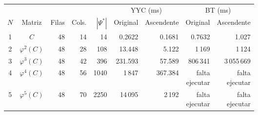 {\scriptsize
\setlength{\tabcolsep}{3pt}
\begin{tabular}{c c r r r r r r r}
\toprule
\multicolumn{5}{c}{} & \multicolumn{2}{c}{YYC (ms)} & \multicolumn{2}{c}{BT (ms)} \\
\cmidrule(lr){6-7}\cmidrule(lr){8-9}
$N$ & Matriz & Filas & Cols. & $|\Psi^*|$ & Original & Ascendente & Original & Ascendente \\
\midrule
1 & $C$ & 48 & 14 & 14 & 0.2622 & 0.1681 & 0.7632 & 1.027 \\
2 & $\varphi^{2}(C)$ & 48 & 28 & 108 & 13.448 & 5.122 & 1\,169 & 1\,124 \\
3 & $\varphi^{3}(C)$ & 48 & 42 & 396 & 231.593 & 57.589 & 806\,341 & 3\,055\,669 \\
4 & $\varphi^{4}(C)$ & 48 & 56 & 1040 & 1\,847 & 367.384 & \shortstack{falta\\ejecutar} & \shortstack{falta\\ejecutar} \\
5 & $\varphi^{5}(C)$ & 48 & 70 & 2250 & 14\,095 & 2\,192 & \shortstack{falta\\ejecutar} & \shortstack{falta\\ejecutar} \\
\bottomrule
\end{tabular}
}
